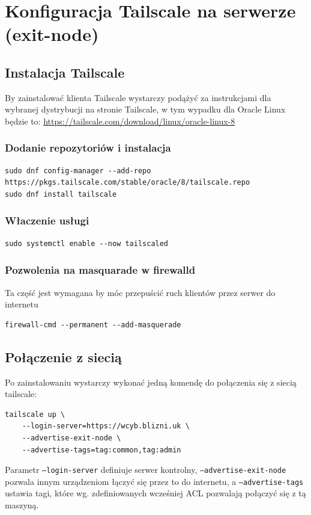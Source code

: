 \documentclass[../main.tex]{subfiles}
\begin{document}
\section{Konfiguracja Tailscale na serwerze (exit-node)}
\subsection{Instalacja Tailscale}
By zainstalować klienta Tailscale wystarczy podążyć za instrukcjami dla wybranej dystrybucji na stronie Tailscale, w tym wypadku dla Oracle Linux będzie to: \url{https://tailscale.com/download/linux/oracle-linux-8}
\subsubsection{Dodanie repozytoriów i instalacja}
\begin{verbatim}
sudo dnf config-manager --add-repo https://pkgs.tailscale.com/stable/oracle/8/tailscale.repo
sudo dnf install tailscale
\end{verbatim}
\subsubsection{Właczenie usługi}
\begin{verbatim}
sudo systemctl enable --now tailscaled
\end{verbatim}
\subsubsection{Pozwolenia na masquarade w firewalld}
Ta część jest wymagana by móc przepuścić ruch klientów przez serwer do internetu
\begin{verbatim}
firewall-cmd --permanent --add-masquerade
\end{verbatim}
\subsection{Połączenie z siecią}
Po zainstalowaniu wystarczy wykonać jedną komendę do połączenia się z siecią tailscale:
\begin{verbatim}
tailscale up \
    --login-server=https://wcyb.blizni.uk \
    --advertise-exit-node \
    --advertise-tags=tag:common,tag:admin
\end{verbatim}
Parametr \texttt{--login-server} definiuje serwer kontrolny, \texttt{--advertise-exit-node} pozwala innym urządzeniom łączyć się przez to do internetu, a \texttt{--advertise-tags} ustawia tagi, które wg. zdefiniowanych wcześniej ACL pozwalają połączyć się z tą maszyną.
\end{document}
